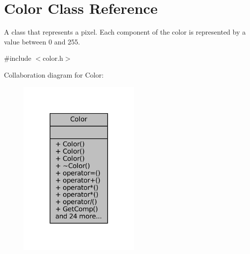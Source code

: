 \hypertarget{classColor}{}\section{Color Class Reference}
\label{classColor}


A class that represents a pixel. Each component of the color is represented by a value between 0 and 255.  




{\ttfamily \#include $<$color.\+h$>$}



Collaboration diagram for Color\+:\nopagebreak
\begin{figure}[H]
\begin{center}
\leavevmode
\includegraphics[width=167pt]{classColor__coll__graph}
\end{center}
\end{figure}

